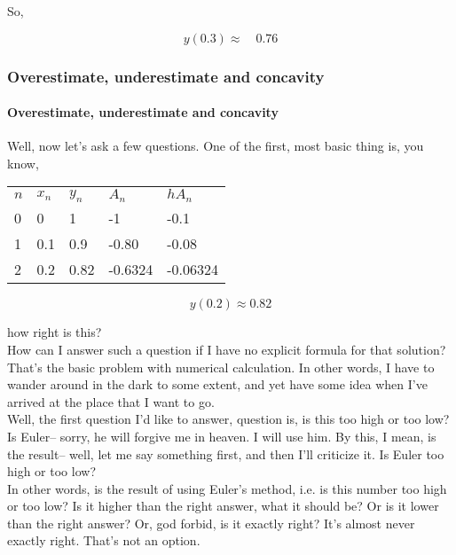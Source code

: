 So,

\begin{equation*}
  y(0.3) \approx \quad 0.76
\end{equation*}

\clearpage

\subsubsection{Overestimate, underestimate and concavity}

\paragraph{Overestimate, underestimate and concavity}
Well, now let's ask a few questions.
One of the first, most basic thing
is, you know,

\begin{table}[ht!]
  \centering
  \begin{tabular}{lllll}
    $n$ & $x_n$ & $y_n$ & $A_n$ & $h A_n$ \\
    0  & 0     & 1     &  -1   &  -0.1    \\
    1  & 0.1   & 0.9   & -0.80 &  -0.08   \\
    2  & 0.2   & 0.82  & -0.6324&  -0.06324 
  \end{tabular}
\end{table}

\begin{equation*}
  y(0.2) \approx 0.82
\end{equation*}

how right is this?\\

How can I answer such a question if I have no explicit formula
for that solution?
That's the basic problem with numerical calculation.
In other words, I have to wander around
in the dark to some extent, and yet
have some idea when I've arrived at the place that I want to go. \\
Well, the first question I'd like to answer,
question is, is this too high or too low?
Is Euler-- sorry, he will forgive me in heaven.
I will use him.
By this, I mean, is the result--
well, let me say something first, and then I'll criticize it.
Is Euler too high or too low? \\
In other words, is the result of using Euler's method, i.e.
is this number too high or too low?
Is it higher than the right answer, what it should be?
Or is it lower than the right answer?
Or, god forbid, is it exactly right?
It's almost never exactly right.
That's not an option.

